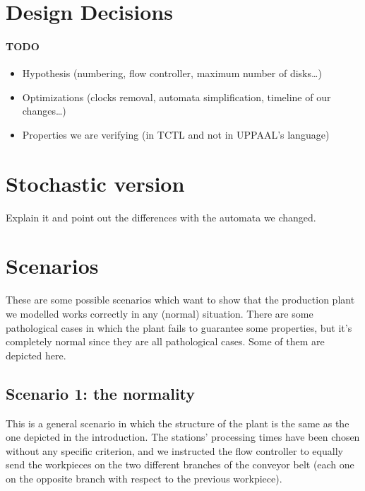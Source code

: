 \documentclass[a4paper]{article}
\begin{document}
    \section{Design Decisions} \label{section:design_decisions}

    \paragraph{TODO}
    \begin{itemize}
        \item Hypothesis (numbering, flow controller, maximum number of disks\dots)
        \item Optimizations (clocks removal, automata simplification, timeline of our changes\dots)
        \item Properties we are verifying (in TCTL and not in UPPAAL's language)
    \end{itemize}

    \section{Stochastic version}

    Explain it and point out the differences with the automata we changed.

    \section{Scenarios}

    These are some possible scenarios which want to show that the production plant we modelled works correctly in any (normal) situation. There are some pathological cases in which the plant fails to guarantee some properties, but it's completely normal since they are all pathological cases. Some of them are depicted here.

    \subsection{Scenario 1: the normality}

    This is a general scenario in which the structure of the plant is the same as the one depicted in the introduction. The stations' processing times have been chosen without any specific criterion, and we instructed the flow controller to equally send the workpieces on the two different branches of the conveyor belt (each one on the opposite branch with respect to the previous workpiece).
\end{document}
